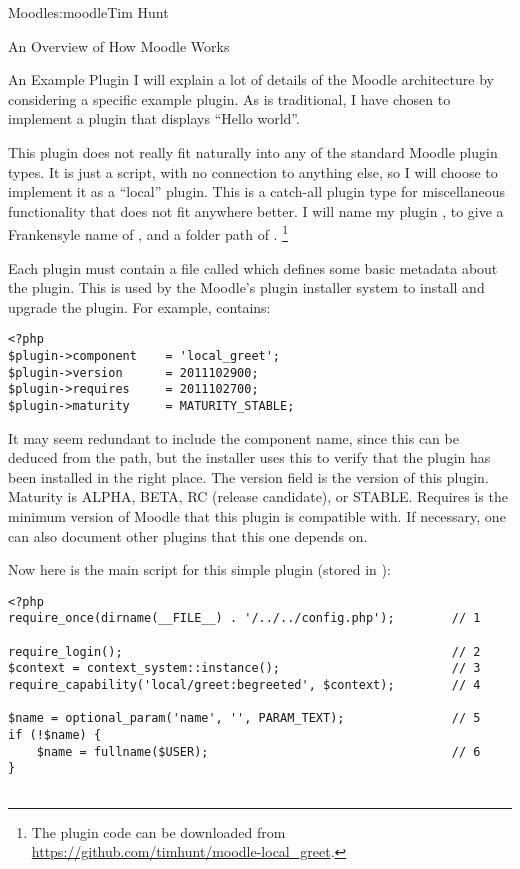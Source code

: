 \begin{aosachapter}{Moodle}{s:moodle}{Tim Hunt}
\begin{aosasect1}{An Overview of How Moodle Works}
\begin{aosasect2}{An Example Plugin}
I will explain a lot of details of the Moodle architecture by
considering a specific example plugin. As is traditional, I have
chosen to implement a plugin that displays ``Hello world''.

This plugin does not really fit naturally into any of the standard
Moodle plugin types. It is just a script, with no connection to
anything else, so I will choose to implement it as a ``local''
plugin. This is a catch-all plugin type for miscellaneous
functionality that does not fit anywhere better. I will name my plugin
, to give a Frankensyle name of , and a
folder path of . \footnote{The plugin code can be downloaded
from \url{https://github.com/timhunt/moodle-local_greet}.}

Each plugin must contain a file called  which
defines some basic metadata about the plugin. This is used by the
Moodle's plugin installer system to install and upgrade the plugin.
For example,  contains:

\begin{verbatim}
<?php
$plugin->component    = 'local_greet';
$plugin->version      = 2011102900;
$plugin->requires     = 2011102700;
$plugin->maturity     = MATURITY_STABLE;
\end{verbatim}

It may seem redundant to include the component name, since this can be
deduced from the path, but the installer uses this to verify that the
plugin has been installed in the right place. The version field is the
version of this plugin. Maturity is ALPHA, BETA, RC (release
candidate), or STABLE. Requires is the minimum version of Moodle that
this plugin is compatible with. If necessary, one can also document
other plugins that this one depends on.

Now here is the main script for this simple plugin (stored in
):

\begin{verbatim}
<?php
require_once(dirname(__FILE__) . '/../../config.php');        // 1

require_login();                                              // 2
$context = context_system::instance();                        // 3
require_capability('local/greet:begreeted', $context);        // 4

$name = optional_param('name', '', PARAM_TEXT);               // 5
if (!$name) {
    $name = fullname($USER);                                  // 6
}


\end{verbatim}
\end{aosasect2}
\end{aosasect1}
\end{aosachapter}
